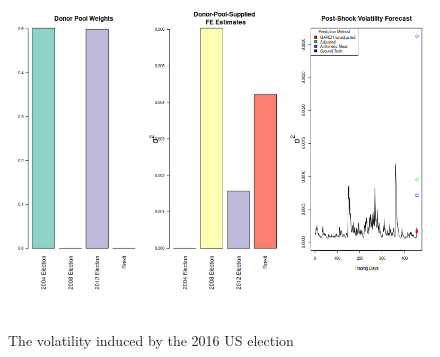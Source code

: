 \documentclass[11pt]{article}
\theoremstyle{definition}
\begin{document}
\begin{figure}[h!]
\begin{center}
  \includegraphics[scale=.6]{real_data_output_plots/savetime_FriOct2707:05:03PM2023_IYG_6B=F-CL=F-^VIX-^IRX-^FVX-^TNX-^TYX_^VIX_2016-11-08-2004-11-02-2008-11-04-2012-11-06-2016-06-23.png}
  \caption{The volatility induced by the 2016 US election}
  \label{fig:SVF_2016}
  \end{center}
\end{figure}
\end{document}
